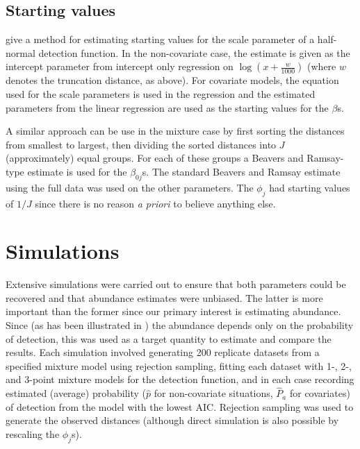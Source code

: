 \subsection{Starting values}

 give a method for estimating starting values for the scale parameter of a half-normal detection function. In the non-covariate case, the estimate is given as the intercept parameter from intercept only regression on $\log(x+\frac{w}{1000})$ (where $w$ denotes the truncation distance, as above). For covariate models, the equation used for the scale parameters is used in the regression and the estimated parameters from the linear regression are used as the starting values for the $\beta$s.

\label{cor-8s9}A similar approach can be use in the mixture case by first sorting the distances from smallest to largest, then dividing the sorted distances into $J$ (approximately) equal groups. For each of these groups a Beavers and Ramsay-type estimate is used for the $\beta_{0j}$s. The standard Beavers and Ramsay estimate using the full data was used on the other parameters. The $\phi_j$ had starting values of $1/J$ since there is no reason \textit{a priori} to believe anything else.

\section{Simulations}
\label{mmds-sims}

Extensive simulations were carried out to ensure that both parameters could be recovered and that abundance estimates were unbiased. The latter is more important than the former since our primary interest is estimating abundance. Since (as has been illustrated in ) the abundance depends only on the probability of detection, this was used as a target quantity to estimate and compare the results. Each simulation involved generating 200 replicate datasets from a specified mixture model using rejection sampling, fitting each dataset with 1-, 2-, and 3-point mixture models for the detection function, and in each case recording estimated (average) probability ($\hat{p}$ for non-covariate situations, $\hat{P}_a$ for covariates) of detection from the model with the lowest AIC. Rejection sampling was used to generate the observed distances (although direct simulation is also possible by rescaling the $\phi_j$s).

